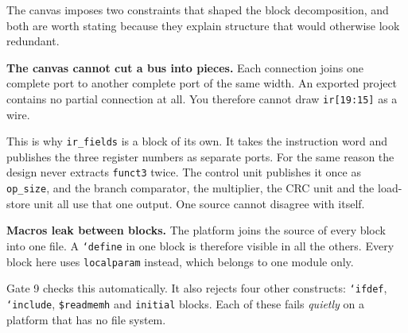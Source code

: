 \documentclass[11pt,a4paper]{article}
\begin{document}
\begin{minipage}[t]{0.52\linewidth}
\vspace{0pt}
The canvas imposes two constraints that shaped the block decomposition, and both are worth
stating because they explain structure that would otherwise look redundant.

\textbf{The canvas cannot cut a bus into pieces.} Each connection joins one complete port
to another complete port of the same width. An exported project contains no partial
connection at all. You therefore cannot draw \texttt{ir[19:15]} as a wire.

This is why \texttt{ir\_fields} is a block of its own. It takes the instruction word and
publishes the three register numbers as separate ports. For the same reason the design
never extracts \texttt{funct3} twice. The control unit publishes it once as
\texttt{op\_size}, and the branch comparator, the multiplier, the CRC unit and the load-store
unit all use that one output. One source cannot disagree with itself.

\textbf{Macros leak between blocks.} The platform joins the source of every block into one
file. A \texttt{`define} in one block is therefore visible in all the others. Every block
here uses \texttt{localparam} instead, which belongs to one module only.

Gate 9 checks this automatically. It also rejects four other constructs: \texttt{`ifdef},
\texttt{`include}, \texttt{\$readmemh} and \texttt{initial} blocks. Each of these fails
\emph{quietly} on a platform that has no file system.
\end{minipage}\hfill
\end{document}
